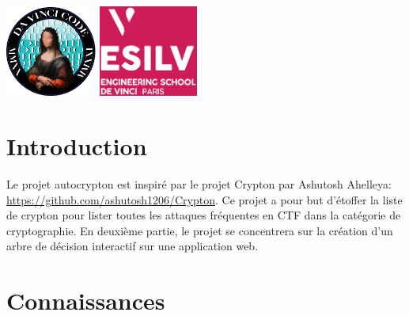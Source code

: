 \documentclass[12pt]{article}
\begin{document}
    \backgroundpages
    \setlength{\columnsep}{-1cm}
    \begin{multicols}{2}\raggedbottom\color{white}
        \noindent
        \parbox[t][40mm][t]{\columnwidth}{\setlength{\parindent}{1em}
        \vspace*{-18mm}
        \includegraphics[height=30mm]{davincicode}
        \includegraphics[height=30mm]{esilv}
        }

        \noindent
        \parbox[c][40mm][c]{\columnwidth}{\setlength{\parindent}{0em}
        \shadowoffsetx{1pt}
        \shadowoffsety{0pt}
        \vspace*{-24mm}
        \vspace{0.5cm}
        }

    \end{multicols}
    \vspace*{-30mm}
    \raggedbottom
    \section{Introduction}
    Le projet autocrypton est inspiré par le projet Crypton par Ashutosh Ahelleya: \url{https://github.com/ashutosh1206/Crypton}. Ce projet a pour but d'étoffer la liste de crypton pour lister toutes les attaques fréquentes en CTF dans la catégorie de cryptographie. En deuxième partie, le projet se concentrera sur la création d'un arbre de décision interactif sur une application web.

	\section{Connaissances}
\end{document}
